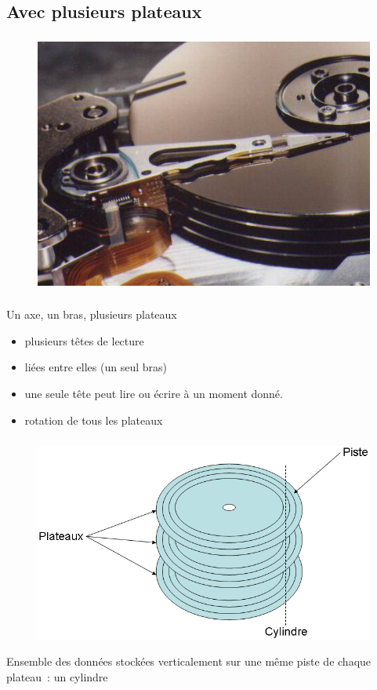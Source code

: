 \subsection{Avec plusieurs plateaux}
\begin{frame}
  \frametitle{\insertsubsection}
  \begin{figure}
    \includegraphics[width=0.8\linewidth]{fig3/harddisk.png}
  \end{figure}
\end{frame}

\begin{frame}
\frametitle{\insertsubsection}
\large{Un axe, un bras, plusieurs plateaux
  \begin{itemize}
  \item plusieurs têtes de lecture 
  \item[\ding{212}] liées entre elles (un seul bras)
  \item[\ding{212}] une seule tête peut lire ou écrire à un moment donné. 
  \item rotation de tous les plateaux
\end{itemize}}
\end{frame}

\begin{frame}
  \frametitle{\insertsubsection}
  \begin{figure}
    \includegraphics[width=0.8\linewidth]{fig3/dd1.png}
  \end{figure}
 Ensemble des données stockées verticalement sur une même piste de chaque plateau~:
 un \alert{cylindre}
\end{frame}

